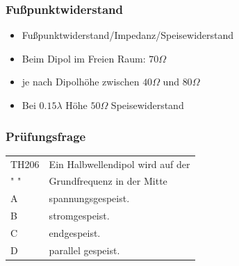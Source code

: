 \begin{frame}
    \frametitle{Fußpunktwiderstand}
    \begin{center}
	\begin{itemize}
		\item Fußpunktwiderstand/Impedanz/Speisewiderstand
		\item Beim Dipol im Freien Raum: $70 \Omega$
		\item je nach Dipolhöhe zwischen $40  \Omega$ und $80  \Omega$
		\item  Bei $0.15 \lambda$ Höhe $50  \Omega$ Speisewiderstand 
    \end{itemize}
 	\end{center}
\end{frame}

\begin{frame}
    \frametitle{Prüfungsfrage}

    \begin{center}
    \begin{tabular}{l||l}\hline
        TH206 & Ein Halbwellendipol wird auf der  \\
         " "  & Grundfrequenz in der Mitte \\ \hline\hline
         A & spannungsgespeist.\\\hline
         B & stromgespeist. \\\hline
         C & endgespeist. \\ \hline
         D & parallel gespeist.\\\hline
    \end{tabular}
 	\end{center}
\end{frame}

